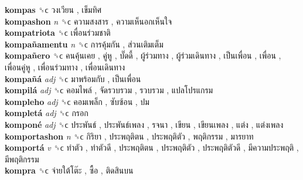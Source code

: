 \textbf{kompas} ␝ϲ   วงเวียน ,  เข็มทิศ   \\
\textbf{kompashon} \emph{n}  ␝ϲ   ความสงสาร ,  ความเห็นอกเห็นใจ   \\
\textbf{kompatriota} ␝ϲ   เพื่อนร่วมชาติ   \\
\textbf{kompañamentu} \emph{n}  ␝ϲ   การคุ้มกัน ,  ส่วนเติมเต็ม   \\
\textbf{kompañero} ␝ϲ   คนคุ้นเคย ,  คู่หู ,  บั๊ดดี้ ,  ผู้ร่วมทาง ,  ผู้ร่วมเดินทาง ,  เป็นเพื่อน ,  เพื่อน ,  เพื่อนคู่หู ,  เพื่อนร่วมทาง ,  เพื่อนเดินทาง   \\
\textbf{kompañá} \emph{adj}  ␝ϲ   มาพร้อมกับ ,  เป็นเพื่อน   \\
\textbf{kompilá} \emph{adj}  ␝ϲ   คอมไพล์ ,  จัดรวบรวม ,  รวบรวม ,  แปลโปรแกรม   \\
\textbf{kompleho} \emph{adj}  ␝ϲ   คอมเพล็ก ,  ซับซ้อน ,  ปม   \\
\textbf{kompletá} \emph{adj}  ␝ϲ   กรอก   \\
\textbf{komponé} \emph{adj}  ␝ϲ   ประพันธ์ ,  ประพันธ์เพลง ,  รจนา ,  เขียน ,  เขียนเพลง ,  แต่ง ,  แต่งเพลง   \\
\textbf{komportashon} \emph{n}  ␝ϲ   กิริยา ,  ประพฤติตน ,  ประพฤติตัว ,  พฤติกรรม ,  มารยาท   \\
\textbf{komportá} \emph{v}  ␝ϲ   ทำตัว ,  ทำตัวดี ,  ประพฤติตน ,  ประพฤติตัว ,  ประพฤติตัวดี ,  มีความประพฤติ ,  มีพฤติกรรม   \\
\textbf{kompra} ␝ϲ   จ่ายใต้โต๊ะ ,  ซื้อ ,  ติดสินบน   \\
